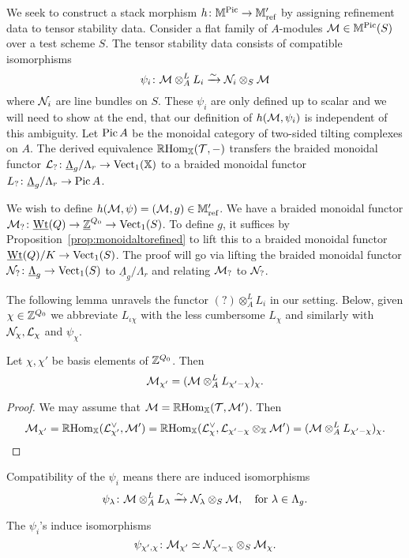 \documentclass[12pt]{amsart}
\begin{document}
We seek to construct a stack morphism $h \colon \mathbb{M}^{\operatorname{Pic}} \to \mathbb{M}'_{\text{ref}}$ by assigning refinement data to tensor stability data. Consider a flat family of $A$-modules $\mathcal{M} \in \mathbb{M}^{\operatorname{Pic}}(S)$ over a test scheme $S$. The tensor stability data consists of  compatible isomorphisms 
$$ \psi_i \colon \mathcal{M} \otimes_A^L L_i \xrightarrow{\sim} \mathcal{N}_i \otimes_S \mathcal{M}$$
where $\mathcal{N}_i$ are line bundles on $S$. These $\psi_i$ are only defined up to scalar and we will need to show at the end, that our definition of $h(\mathcal{M},\psi_i)$ is independent of this ambiguity. Let $\operatorname{Pic} A$ be the monoidal category of two-sided tilting complexes on $A$. The derived equivalence $\mathop{\mathbb{R}\mathrm{Hom}}\nolimits_{\mathbb{X}}(\mathcal{T},-)$ transfers the braided monoidal functor $\mathcal{L}_? \colon \underline{\Lambda}_g/\Lambda_r \to \operatorname{Vect}_1(\mathbb{X})$ to a braided monoidal functor $L_? \colon \underline{\Lambda}_g/\Lambda_r \to \operatorname{Pic} A$. 

We wish to define $h(\mathcal{M}, \psi) = (\mathcal{M},g) \in \mathbb{M}'_{\text{ref}}$. We have a braided monoidal functor $\mathcal{M}_?\colon \underline{\text{Wt}}(Q) \to \underline{\mathbb{Z}}^{Q_0} \to \operatorname{Vect}_1(S)$. To define $g$, it suffices by Proposition~\ref{prop:monoidaltorefined} to lift this to a braided monoidal functor $\underline{\text{Wt}}(Q)/K \to \operatorname{Vect}_1(S)$. The proof will go via lifting the braided monoidal functor $\mathcal{N}_?\colon \underline{\Lambda}_g \to \operatorname{Vect}_1(S)$ to $\underline{\Lambda}_g/\Lambda_r$ and relating $\mathcal{M}_?$ to $\mathcal{N}_?$.

The following lemma unravels the functor $(?)\otimes_A^L L_i$ in our setting. Below, given $\chi \in \mathbb{Z}^{Q_0}$ we abbreviate $L_{\iota\chi}$ with the less cumbersome $L_{\chi}$ and similarly with $\mathcal{N}_{\chi}, \mathcal{L}_{\chi}$ and $\psi_{\chi}$.
\begin{lemma}   \label{lem:LonM}
Let $\chi, \chi'$ be basis elements of $\mathbb{Z}^{Q_0}$. Then
$$ \mathcal{M}_{\chi'} = (\mathcal{M} \otimes_A^L L_{\chi'-\chi})_{\chi}.$$
\end{lemma}
\begin{proof}
We may assume that $\mathcal{M} = \mathop{\mathbb{R}\mathrm{Hom}}\nolimits_{\mathbb{X}}(\mathcal{T},\mathcal{M}')$. Then
$$ \mathcal{M}_{\chi'}  = 
\mathop{\mathbb{R}\mathrm{Hom}}\nolimits_{\mathbb{X}}(\mathcal{L}_{\chi'}^{\vee}, \mathcal{M}') = 
\mathop{\mathbb{R}\mathrm{Hom}}\nolimits_{\mathbb{X}}(\mathcal{L}_{\chi}^{\vee}, \mathcal{L}_{\chi'-\chi}\otimes_{\mathbb{X}} \mathcal{M}')
= (\mathcal{M} \otimes_A^L L_{\chi'-\chi})_{\chi}.$$
\end{proof}
Compatibility of the $\psi_i$ means there are induced isomorphisms
$$ \psi_{\lambda} \colon \mathcal{M} \otimes_A^L L_{\lambda} \xrightarrow{\sim} \mathcal{N}_{\lambda} \otimes_S \mathcal{M}, \quad \text{for}\ \lambda \in \Lambda_g.$$
\begin{corollary} \label{cor:MtoN}
The $\psi_i$'s induce isomorphisms
$$ \psi_{\chi',\chi} \colon\mathcal{M}_{\chi'} \simeq \mathcal{N}_{\chi'-\chi} \otimes_S \mathcal{M}_{\chi}. $$
\end{corollary}
\end{document}
